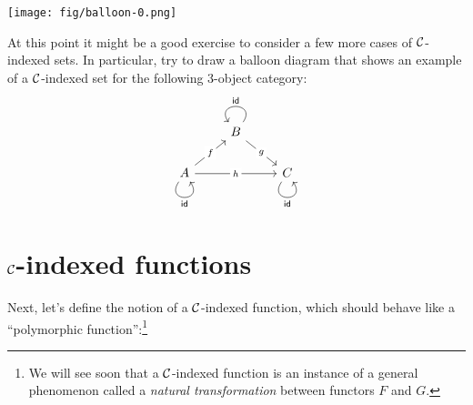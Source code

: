 \begin{itemize}
\begin{center}
  \texttt{[image: fig/balloon-0.png]}
\end{center}



\end{itemize}

At this point it might be a good exercise to consider a few more 
cases of $\mathcal C$-indexed sets. In particular, try to 
draw a balloon diagram that shows an example of a $\mathcal C$-indexed set for the
following 3-object category:
\begin{equation}
\begin{tikzcd}
  & B \arrow[rd, "g" description] \arrow["\textsf{id}"', loop, distance=2em, in=125, out=55] &                                                               \\
A \arrow[rr, "h" description] \arrow[ru, "f" description] \arrow["\textsf{id}"', loop, distance=2em, in=305, out=235] &                                                                                          & C \arrow["\textsf{id}"', loop, distance=2em, in=305, out=235]
\end{tikzcd} 
\end{equation}



\section{$\mathcal C$-indexed functions}
Next, let's define the notion of a $\mathcal C$-indexed function, which 
should behave like a ``polymorphic function'':\footnote{We will see 
soon that a $\mathcal C$-indexed function is an instance of a general phenomenon called 
a \emph{natural transformation}
between functors $F$ and $G$.}

